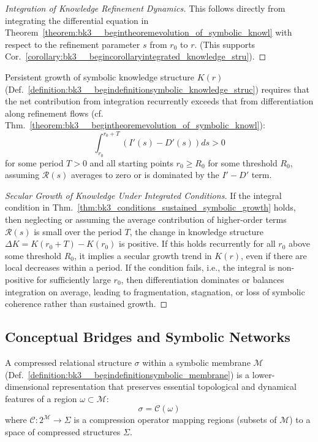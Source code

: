 \begin{proof}[Integration of Knowledge Refinement Dynamics]
\label{proof:bk3_integrated_knowledge_dynamics}
This follows directly from integrating the differential equation in Theorem~\ref{theorem:bk3__begintheoremevolution_of_symbolic_knowl} with respect to the refinement parameter $s$ from $r_0$ to $r$. (This supports Cor.~\ref{corollary:bk3__begincorollaryintegrated_knowledge_stru}).
\end{proof}

\begin{theorem} \label{thm:bk3_conditions_sustained_symbolic_growth}
Persistent growth of symbolic knowledge structure $K(r)$ (Def.~\ref{definition:bk3__begindefinitionsymbolic_knowledge_struc}) requires that the net contribution from integration recurrently exceeds that from differentiation along refinement flows (cf. Thm.~\ref{theorem:bk3__begintheoremevolution_of_symbolic_knowl}):
\[
\int_{r_0}^{r_0+T} (I'(s) - D'(s)) ds > 0
\]
for some period $T > 0$ and all starting points $r_0 \geq R_0$ for some threshold $R_0$, assuming $\mathcal{R}(s)$ averages to zero or is dominated by the $I'-D'$ term.
\end{theorem}

\begin{proof}[Secular Growth of Knowledge Under Integrated Conditions]
\label{proof:bk3_knowledge_growth_integrated_condition}
If the integral condition in Thm.~\ref{thm:bk3_conditions_sustained_symbolic_growth} holds, then neglecting or assuming the average contribution of higher-order terms $\mathcal{R}(s)$ is small over the period $T$, the change in knowledge structure $\Delta K = K(r_0+T) - K(r_0)$ is positive. If this holds recurrently for all $r_0$ above some threshold $R_0$, it implies a secular growth trend in $K(r)$, even if there are local decreases within a period. If the condition fails, i.e., the integral is non-positive for sufficiently large $r_0$, then differentiation dominates or balances integration on average, leading to fragmentation, stagnation, or loss of symbolic coherence rather than sustained growth.
\end{proof}

\subsection{Conceptual Bridges and Symbolic Networks}

\begin{definition} \label{definition:bk3__begindefinitioncompressed_relational_st}
A compressed relational structure $\sigma$ within a symbolic membrane $\mathcal{M}$ (Def.~\ref{definition:bk3__begindefinitionsymbolic_membrane}) is a lower-dimensional representation that preserves essential topological and dynamical features of a region $\omega \subset \mathcal{M}$:
\[
\sigma = \mathcal{C}(\omega)
\]
where $\mathcal{C}: 2^{\mathcal{M}} \rightarrow \Sigma$ is a compression operator mapping regions (subsets of $\mathcal{M}$) to a space of compressed structures $\Sigma$.
\end{definition}


